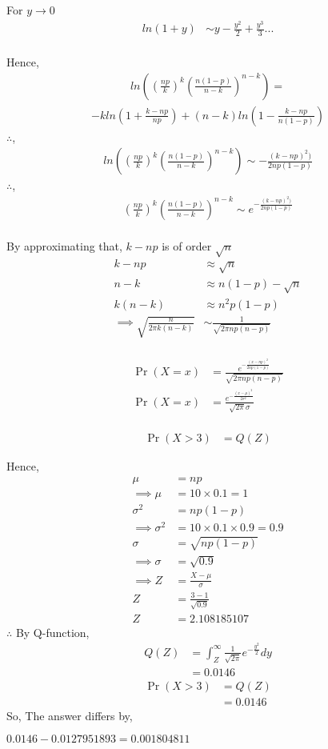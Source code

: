 \documentclass[journal,12pt,twocolumn]{IEEEtran}
\providecommand{\pr}[1]{\ensuremath{\Pr\left(#1\right)}}
\theoremstyle{remark}
\begin{document}
For \( y\to 0\)
\begin{align}
ln(1+y) &\sim y - \frac{y^2}{2} +  \frac{y^3}{3} ...
\end{align}
\\
Hence,
\begin{align}
ln\left(\left(\frac{np}{k}\right)^{k}\left(\frac{n(1-p)}{n-k}\right)^{n-k}\right) = 
\end{align}
\begin{align}
-k ln\left(1 + \frac{k-np}{np}\right) + (n-k)ln\left(1 - \frac{k-np}{n(1-p)}\right)
\end{align}
$\therefore$,
\begin{align}
ln\left(\left(\frac{np}{k}\right)^{k}\left(\frac{n(1-p)}{n-k}\right)^{n-k}\right) \sim - \frac{(k-np)^2)}{2np(1-p)}
\end{align}
$\therefore$,
\begin{align}
\left(\frac{np}{k}\right)^{k}\left(\frac{n(1-p)}{n-k}\right)^{n-k} \sim e^{-\frac{(k-np)^2)}{2np(1-p)}}
\end{align}
\\
By approximating that, $k-np$ is of order $\sqrt{n}$
\begin{align}
k-np &\approx \sqrt{n}\\
n -k &\approx n(1-p) - \sqrt{n}\\
k(n -k) &\approx n^2p(1-p)\\
\implies
	\sqrt{\frac{n}{2\pi k (n-k)}} &\sim \frac{1}{\sqrt{2\pi np (n-p)}}
\end{align}
\\
\begin{align}
\pr{X = x} &= \frac{e^{-\frac{(x-np)^2}{2np(1-p)}}}{\sqrt{2\pi np (n-p)}} \\
\pr{X = x} &= \frac{e^{-\frac{(x-\mu)^2}{2\sigma^2}}}{\sqrt{2\pi}\sigma}
\end{align}
\\
\begin{align}
\pr{X > 3} &= Q(Z)
\end{align}

Hence,
\begin{align} 
	\mu &= np\\
\implies
	\mu &= 10 \times 0.1 = 1\\
	\sigma^{2}&= np(1-p)\\
\implies	
	\sigma^{2}&= 10 \times 0.1 \times 0.9 = 0.9\\
	\sigma&=\sqrt{np(1-p)}\\
\implies
	\sigma&= \sqrt{0.9}\\
\implies
	Z &= \frac{X-\mu}{\sigma}\\
	Z &= \frac{3-1}{\sqrt{0.9}}\\
	Z &= 2.108185107
\end{align}
$\therefore$
By Q-function,
\begin{align}
Q(Z) &= \int_Z^{\infty} \frac{1}{\sqrt{2\pi}}e^{-\frac{y^2}{2}}dy\\
     &= 0.0146
\end{align}
\begin{align}
\pr{X > 3} &= Q(Z)\\
	  &= 0.0146
\end{align}
So, The answer differs by,

\(0.0146 - 0.0127951893 = 0.001804811\)
\end{document}
